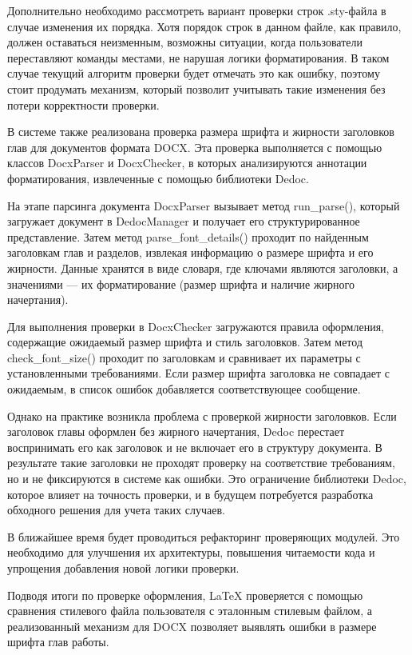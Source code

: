 \documentclass{report}
\begin{document}
Дополнительно необходимо рассмотреть вариант проверки строк .sty-файла в случае изменения их порядка. Хотя порядок строк в данном файле, как правило, должен оставаться неизменным, возможны ситуации, когда пользователи переставляют команды местами, не нарушая логики форматирования. В таком случае текущий алгоритм проверки будет отмечать это как ошибку, поэтому стоит продумать механизм, который позволит учитывать такие изменения без потери корректности проверки.

В системе также реализована проверка размера шрифта и жирности заголовков глав для документов формата DOCX. Эта проверка выполняется с помощью классов DocxParser и DocxChecker, в которых анализируются аннотации форматирования, извлеченные с помощью библиотеки Dedoc.

На этапе парсинга документа DocxParser вызывает метод run\_parse(), который загружает документ в DedocManager и получает его структурированное представление. Затем метод parse\_font\_details() проходит по найденным заголовкам глав и разделов, извлекая информацию о размере шрифта и его жирности. Данные хранятся в виде словаря, где ключами являются заголовки, а значениями — их форматирование (размер шрифта и наличие жирного начертания).

Для выполнения проверки в DocxChecker загружаются правила оформления, содержащие ожидаемый размер шрифта и стиль заголовков. Затем метод check\_font\_size() проходит по заголовкам и сравнивает их параметры с установленными требованиями. Если размер шрифта заголовка не совпадает с ожидаемым, в список ошибок добавляется соответствующее сообщение.

Однако на практике возникла проблема с проверкой жирности заголовков. Если заголовок главы оформлен без жирного начертания, Dedoc перестает воспринимать его как заголовок и не включает его в структуру документа. В результате такие заголовки не проходят проверку на соответствие требованиям, но и не фиксируются в системе как ошибки. Это ограничение библиотеки Dedoc, которое влияет на точность проверки, и в будущем потребуется разработка обходного решения для учета таких случаев.

В ближайшее время будет проводиться рефакторинг проверяющих модулей. Это необходимо для улучшения их архитектуры, повышения читаемости кода и упрощения добавления новой логики проверки.

Подводя итоги по проверке оформления, LaTeX проверяется с помощью сравнения стилевого файла пользователя с эталонным стилевым  файлом, а реализованный механизм для DOCX позволяет выявлять ошибки в размере шрифта глав работы.
\end{document}
